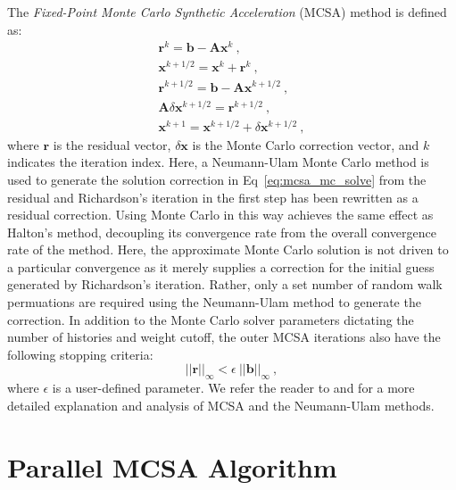 \documentclass{snamc2013}
\begin{document}
The \textit{Fixed-Point Monte Carlo Synthetic Acceleration} (MCSA)
method is defined as:
\begin{subequations}
  \begin{gather}
    \mathbf{r}^{k} = \mathbf{b} - \mathbf{A}\mathbf{x}^{k}\:,\\
    \mathbf{x}^{k+1/2} = \mathbf{x}^k + \mathbf{r}^k\:,\\
    \mathbf{r}^{k+1/2} = \mathbf{b} - \mathbf{A}\mathbf{x}^{k+1/2}\:,\\
    \label{eq:mcsa_mc_solve}
    \mathbf{A}\delta\mathbf{x}^{k+1/2} = \mathbf{r}^{k+1/2}\:,\\
    \mathbf{x}^{k+1} = \mathbf{x}^{k+1/2} + \delta \mathbf{x}^{k+1/2}\:,
  \end{gather}
  \label{eq:mcsa}
\end{subequations}
where $\mathbf{r}$ is the residual vector, $\delta\mathbf{x}$ is the
Monte Carlo correction vector, and $k$ indicates the iteration
index. Here, a Neumann-Ulam Monte Carlo method is used to generate the
solution correction in Eq~\ref{eq:mcsa_mc_solve} from the residual and
Richardson's iteration in the first step has been rewritten as a
residual correction. Using Monte Carlo in this way achieves the same
effect as Halton's method, decoupling its convergence rate from the
overall convergence rate of the method. Here, the approximate Monte
Carlo solution is not driven to a particular convergence as it merely
supplies a correction for the initial guess generated by Richardson's
iteration. Rather, only a set number of random walk permuations are
required using the Neumann-Ulam method to generate the correction. In
addition to the Monte Carlo solver parameters dictating the number of
histories and weight cutoff, the outer MCSA iterations also have the
following stopping criteria:
\begin{equation}
  ||\mathbf{r}||_\infty < \epsilon \ ||\mathbf{b}||_\infty\:,
  \label{eq:mcsa_stopping_criteria}
\end{equation}
where $\epsilon$ is a user-defined parameter. We refer the reader to
\cite{evans_monte_2012} and \cite{evans_monte_2009} for a more
detailed explanation and analysis of MCSA and the Neumann-Ulam
methods.

\section{Parallel MCSA Algorithm}
\end{document}
